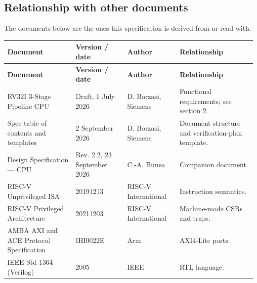 \documentclass[11pt]{article}
\begin{document}
\subsection{Relationship with other documents}
\noindent The documents below are the ones this specification is derived from or read with.\par\medskip
{\small
\begin{longtable}{@{}L{0.3400\dimexpr\linewidth-36pt\relax}L{0.2200\dimexpr\linewidth-36pt\relax}L{0.1800\dimexpr\linewidth-36pt\relax}L{0.2600\dimexpr\linewidth-36pt\relax}@{}}
\toprule
\textbf{Document} & \textbf{Version / date} & \textbf{Author} & \textbf{Relationship} \\ \midrule
\endfirsthead
\toprule
\textbf{Document} & \textbf{Version / date} & \textbf{Author} & \textbf{Relationship} \\ \midrule
\endhead
RV32I 3-Stage Pipeline CPU & Draft, 1 July 2026 & D. Borzasi, Siemens & Functional requirements; see section 2. \\ \addlinespace[3pt]
Spec table of contents and templates & 2 September 2026 & D. Borzasi, Siemens & Document structure and verification-plan template. \\ \addlinespace[3pt]
Design Specification — CPU & Rev. 2.2, 23 September 2026 & C.-A. Bunea & Companion document. \\ \addlinespace[3pt]
RISC-V Unprivileged ISA & 20191213 & RISC-V International & Instruction semantics. \\ \addlinespace[3pt]
RISC-V Privileged Architecture & 20211203 & RISC-V International & Machine-mode CSRs and traps. \\ \addlinespace[3pt]
AMBA AXI and ACE Protocol Specification & IHI0022E & Arm & AXI4-Lite ports. \\ \addlinespace[3pt]
IEEE Std 1364 (Verilog) & 2005 & IEEE & RTL language. \\*
\bottomrule\end{longtable}}

\end{document}
